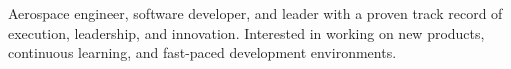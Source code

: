 \documentclass[a4paper]{article}
\begin{document}
Aerospace engineer, software developer, and leader with a proven track record of execution, leadership, and innovation. Interested in working on new products, continuous learning, and fast-paced development environments.
\linebreak
\linebreak
{}







\end{document}
